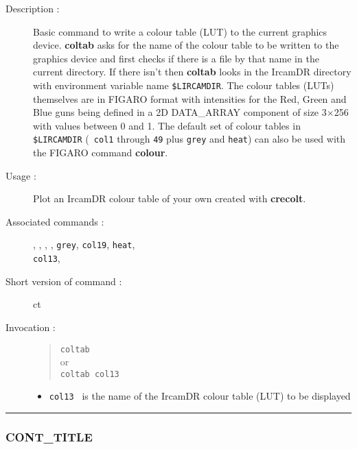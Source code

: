 \begin{description}

\item[Description :] Basic command to write a colour table (LUT) to the
current graphics device.  {\bf coltab} asks for the name of the colour table
to be written to the graphics device and first checks if there is a
file by that name in the current directory.  If there isn't then {\bf coltab}
looks in the {\sc IrcamDR} directory with environment variable name
{\tt \$LIRCAMDIR}. The colour tables (LUTs) themselves are in FIGARO
format with intensities for the Red, Green and Blue guns being defined
in a 2D DATA\_ARRAY component of size 3$\times$256 with values between
0 and 1.  The default set of colour tables in {\tt \$LIRCAMDIR} ({\tt
col1} through {\tt 49} plus {\tt grey} and {\tt heat}) can also be used
with the FIGARO command {\bf colour}.

\item[Usage :] Plot an {\sc IrcamDR} colour table of your own
created with {\bf crecolt}.
\item[Associated commands :] {\tt {}},
{\tt {}}, {\tt {}},
{\tt {}}, {\tt grey}, {\tt col19}, {\tt heat}, \\
{\tt col13}, {\tt {}}
\item[Short version of command :] ct
\item[Invocation :]

\begin{quote}{\tt  coltab }\\
or \\
{\tt coltab col13 }
\end{quote}

\begin{itemize}

\item {\tt col13 } is the name of the {\sc IrcamDR} colour table (LUT) to be
displayed
\end{itemize}

\end{description}

\hrule
\subsubsection*{\label{CONT_TITLE}CONT\_TITLE}

